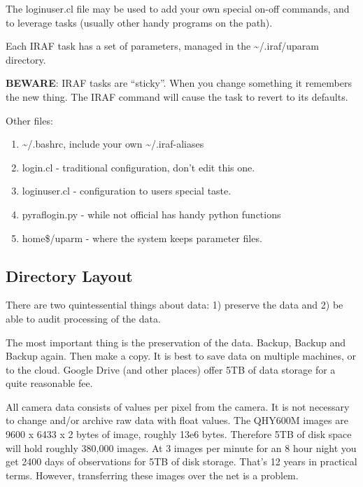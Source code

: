 \documentclass[letter,11pt,oneside]{article}
\newcommand{\dhl}[1]{{\color{verbcolor}{\texttt#1}}}
\begin{document}
The loginuser.cl file may be used to add your own special on-off commands,
and to leverage \dhl{foreign} tasks (usually other handy programs on the
path). 

Each IRAF task has a set of parameters, managed in the {\textasciitilde}/.iraf/uparam
directory. 

\textbf{BEWARE}: IRAF tasks are ``sticky''. When you change something it remembers the new
thing. The IRAF command \dhl{unlearn <task>} will cause the task to revert to
its defaults. 

Other files:

\vspace{-.15cm}
\begin{enumerate}\addtolength{\itemsep}{-0.5\baselineskip}
   \item  {\textasciitilde}/.bashrc, include your own {\textasciitilde}/.iraf-aliases
   \item  login.cl  - traditional configuration, don't edit this one.
   \item  loginuser.cl - configuration to users special taste.
   \item  pyraflogin.py - while not official has handy python functions
   \item  home\$/uparm - where the system keeps parameter files.
\end{enumerate}

\subsection{Directory Layout}

There are two quintessential things about data: 1) preserve the data
and 2) be able to audit processing of the data.

The most important thing is the preservation of the data. Backup,
Backup and Backup again. Then make a copy. It is best to save data on
multiple machines, or to the cloud. Google Drive (and other places)
offer 5TB of data storage for a quite reasonable fee.

All camera data consists of \dhl{16-bit unsigned ADU} values per pixel from
the camera. It is not necessary to change and/or archive raw data with
float values. The QHY600M images are 9600 x 6433 x 2 bytes of image,
roughly 13e6 bytes. Therefore 5TB of disk space will hold roughly
380,000 images. At 3 images per minute for an 8 hour night you get
2400 days of observations for 5TB of disk storage. That's 12 years in
practical terms. However, transferring these images over the net is a
problem.
\end{document}
